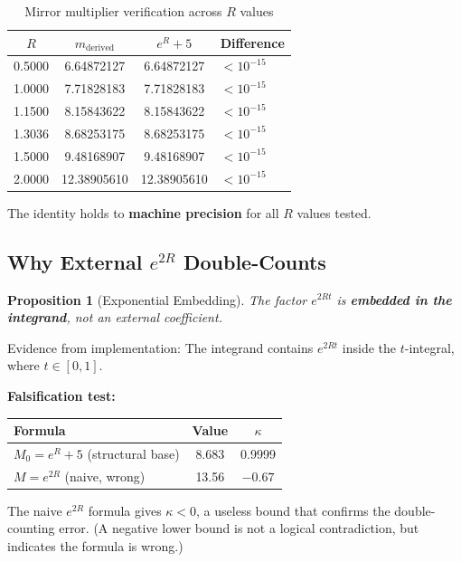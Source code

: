 \documentclass[11pt]{article}
\newtheorem{proposition}{Proposition}
\begin{document}
\begin{table}[h]
\centering
\caption{Mirror multiplier verification across $R$ values}
\begin{tabular}{cccl}
\toprule
$R$ & $m_{\text{derived}}$ & $e^R + 5$ & Difference \\
\midrule
0.5000 & 6.64872127 & 6.64872127 & $< 10^{-15}$ \\
1.0000 & 7.71828183 & 7.71828183 & $< 10^{-15}$ \\
1.1500 & 8.15843622 & 8.15843622 & $< 10^{-15}$ \\
1.3036 & 8.68253175 & 8.68253175 & $< 10^{-15}$ \\
1.5000 & 9.48168907 & 9.48168907 & $< 10^{-15}$ \\
2.0000 & 12.38905610 & 12.38905610 & $< 10^{-15}$ \\
\bottomrule
\end{tabular}
\end{table}

The identity holds to \textbf{machine precision} for all $R$ values tested.

\subsection{Why External $e^{2R}$ Double-Counts}

\begin{proposition}[Exponential Embedding]
The factor $e^{2Rt}$ is \textbf{embedded in the integrand}, not an external coefficient.
\end{proposition}

Evidence from implementation: The integrand contains $e^{2Rt}$ inside the $t$-integral, where $t \in [0,1]$.

\textbf{Falsification test:}
\begin{center}
\begin{tabular}{lcc}
\toprule
Formula & Value & $\kappa$ \\
\midrule
$M_0 = e^R + 5$ (structural base) & 8.683 & 0.9999 \\
$M = e^{2R}$ (naive, wrong) & 13.56 & \textcolor{signflip}{\textbf{$-0.67$}} \\
\bottomrule
\end{tabular}
\end{center}

The naive $e^{2R}$ formula gives $\kappa < 0$, a useless bound that confirms the double-counting error. (A negative lower bound is not a logical contradiction, but indicates the formula is wrong.)
\end{document}
